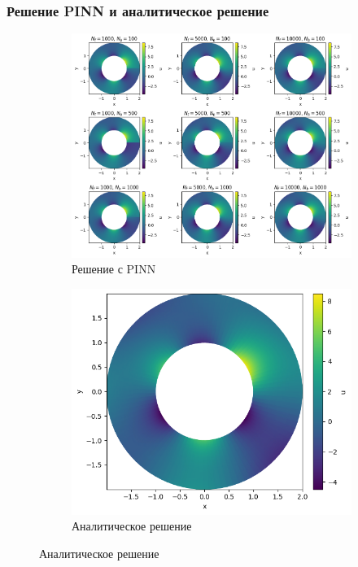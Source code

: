 \documentclass[t]{beamer}
\begin{document}
    \begin{frame}
        \frametitle{Решение PINN и аналитическое решение}
        \begin{figure}[ht]
            \center
            \begin{subfigure}{0.7\textwidth}
                \includegraphics[width=\textwidth]{../plots/termal/solut l = (20x4) Nf=[1000, 5000, 10000] Nu=[100, 500, 1000].png}
                \caption{Решение с PINN}
            \end{subfigure}
            \hfil
            \begin{subfigure}{0.2\textwidth}
                \includegraphics[width=\textwidth]{../plots/termal/solut analit.png}
                \caption{Аналитическое решение}
            \end{subfigure}
        \end{figure}
    \end{frame}
\end{document}
